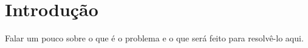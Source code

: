 \section{Introdução}

Falar um pouco sobre o que é o problema e o que será feito para resolvê-lo aqui.